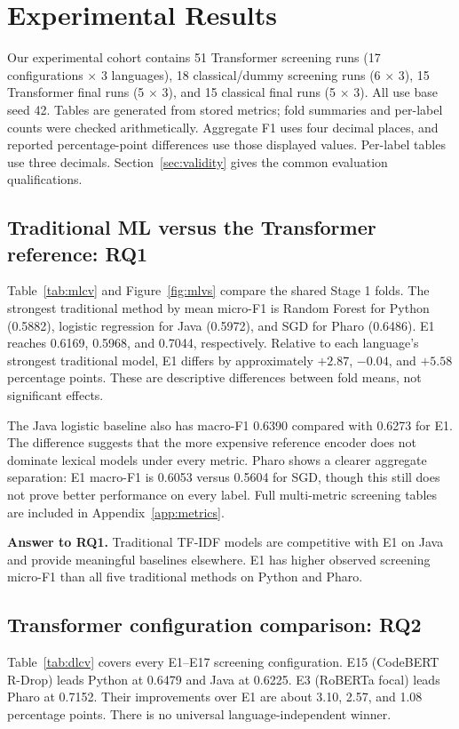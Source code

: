 \section{Experimental Results}
Our experimental cohort contains 51 Transformer screening runs (17 configurations $\times$ 3 languages), 18 classical/dummy screening runs (6 $\times$ 3), 15 Transformer final runs (5 $\times$ 3), and 15 classical final runs (5 $\times$ 3). All use base seed 42. Tables are generated from stored metrics; fold summaries and per-label counts were checked arithmetically. Aggregate F1 uses four decimal places, and reported percentage-point differences use those displayed values. Per-label tables use three decimals. Section~\ref{sec:validity} gives the common evaluation qualifications.

\subsection{Traditional ML versus the Transformer reference: RQ1}
Table~\ref{tab:mlcv} and Figure~\ref{fig:mlvs} compare the shared Stage 1 folds. The strongest traditional method by mean micro-F1 is Random Forest for Python (0.5882), logistic regression for Java (0.5972), and SGD for Pharo (0.6486). E1 reaches 0.6169, 0.5968, and 0.7044, respectively. Relative to each language's strongest traditional model, E1 differs by approximately $+2.87$, $-0.04$, and $+5.58$ percentage points. These are descriptive differences between fold means, not significant effects.


The Java logistic baseline also has macro-F1 0.6390 compared with 0.6273 for E1. The difference suggests that the more expensive reference encoder does not dominate lexical models under every metric. Pharo shows a clearer aggregate separation: E1 macro-F1 is 0.6053 versus 0.5604 for SGD, though this still does not prove better performance on every label. Full multi-metric screening tables are included in Appendix~\ref{app:metrics}.

\textbf{Answer to RQ1.} Traditional TF-IDF models are competitive with E1 on Java and provide meaningful baselines elsewhere. E1 has higher observed screening micro-F1 than all five traditional methods on Python and Pharo.

\subsection{Transformer configuration comparison: RQ2}
Table~\ref{tab:dlcv} covers every E1--E17 screening configuration. E15 (CodeBERT R-Drop) leads Python at 0.6479 and Java at 0.6225. E3 (RoBERTa focal) leads Pharo at 0.7152. Their improvements over E1 are about 3.10, 2.57, and 1.08 percentage points. There is no universal language-independent winner.


